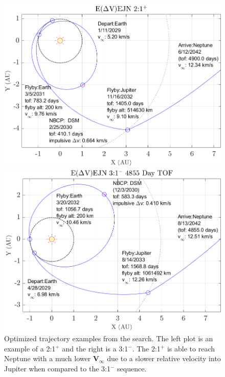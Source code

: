 \documentclass[letterpaper, preprint, paper,11pt]{AAS}	%
\begin{document}
\begin{figure}[ht]
		\centering
		\begin{minipage}{0.50\textwidth}
				\centering
				\includegraphics[width=1.0\textwidth]{./fig/eejn21plus}
    \end{minipage}\hfill
		\begin{minipage}{0.50\textwidth}
				\centering
				\includegraphics[width=1.0\textwidth]{./fig/eejn31minus4850}
		\end{minipage}
		\caption{Optimized trajectory examples from the search. The left plot is an example of a 2:1$^{+}$ and the right is a 3:1$^{-}$. The 2:1$^{+}$ is able to reach Neptune with a much lower $\boldsymbol{V_\infty}$ due to a slower relative velocity into Jupiter when compared to the 3:1$^{-}$ sequence.}
		\label{fig:maltotriton}
\end{figure}
\end{document}
